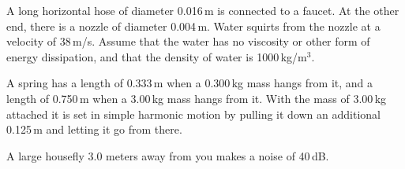 \documentclass[letterpaper,addpoints,answers]{exam}
\begin{document}
\begin{questions}

\question
A long horizontal hose of diameter 0.016\,m is connected to a faucet. At the other end, there is a nozzle of diameter 0.004\,m. Water squirts from the nozzle at a velocity of 38\,m/s. Assume that the water has no viscosity or other form of energy dissipation, and that the density of water is 1000\,kg/m$^3$.

\pagebreak

\question
A spring has a length of 0.333\,m when a 0.300\,kg mass hangs from it, and a length of 0.750\,m when a 3.00\,kg mass hangs from it.  With the mass of 3.00\,kg attached it is set in simple harmonic motion by pulling it down an additional 0.125\,m and letting it go from there.

\question
A large housefly 3.0 meters away from you makes a noise of 40\,dB.
\begin{parts}

\end{parts}
\end{questions}
\end{document}
